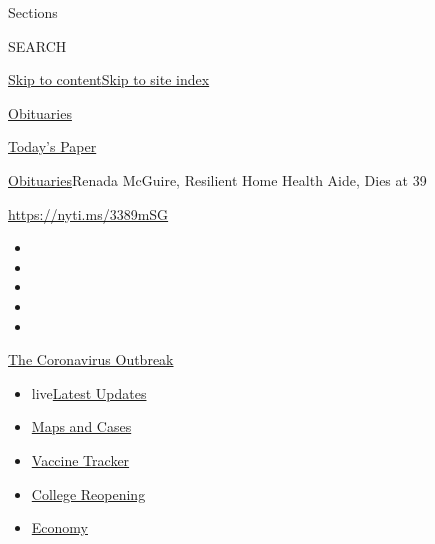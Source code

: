 Sections

SEARCH

\protect\hyperlink{site-content}{Skip to
content}\protect\hyperlink{site-index}{Skip to site index}

\href{https://www.nytimes.com/section/obituaries}{Obituaries}

\href{https://myaccount.nytimes.com/auth/login?response_type=cookie\&client_id=vi}{}

\href{https://www.nytimes.com/section/todayspaper}{Today's Paper}

\href{/section/obituaries}{Obituaries}\textbar{}Renada McGuire,
Resilient Home Health Aide, Dies at 39

\url{https://nyti.ms/3389mSG}

\begin{itemize}
\item
\item
\item
\item
\item
\end{itemize}

\href{https://www.nytimes.com/news-event/coronavirus?action=click\&pgtype=Article\&state=default\&region=TOP_BANNER\&context=storylines_menu}{The
Coronavirus Outbreak}

\begin{itemize}
\tightlist
\item
  live\href{https://www.nytimes.com/2020/08/03/world/coronavirus-covid-19.html?action=click\&pgtype=Article\&state=default\&region=TOP_BANNER\&context=storylines_menu}{Latest
  Updates}
\item
  \href{https://www.nytimes.com/interactive/2020/us/coronavirus-us-cases.html?action=click\&pgtype=Article\&state=default\&region=TOP_BANNER\&context=storylines_menu}{Maps
  and Cases}
\item
  \href{https://www.nytimes.com/interactive/2020/science/coronavirus-vaccine-tracker.html?action=click\&pgtype=Article\&state=default\&region=TOP_BANNER\&context=storylines_menu}{Vaccine
  Tracker}
\item
  \href{https://www.nytimes.com/2020/08/02/us/covid-college-reopening.html?action=click\&pgtype=Article\&state=default\&region=TOP_BANNER\&context=storylines_menu}{College
  Reopening}
\item
  \href{https://www.nytimes.com/live/2020/08/03/business/stock-market-today-coronavirus?action=click\&pgtype=Article\&state=default\&region=TOP_BANNER\&context=storylines_menu}{Economy}
\end{itemize}

